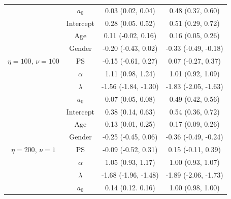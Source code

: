 \documentclass[a4paper, notitlepage, 11pt]{article}
\begin{document}
\begin{table}[!ht]
\begin{tabular}{cccc}
                                            & $a_0$     & 0.03 (0.02, 0.04)    & 0.48 (0.37, 0.60)           \\
\multirow{7}{*}{$\eta = 100$, $\nu  = 100$} & Intercept & 0.28 (0.05. 0.52)    & 0.51 (0.29, 0.72)           \\
                                            & Age       & 0.11 (-0.02, 0.16)   & 0.16 (0.05, 0.26)           \\
                                            & Gender    & -0.20 (-0.43, 0.02)  & -0.33 (-0.49, -0.18)        \\
                                            & PS        & -0.15 (-0.61, 0.27)  & 0.07 (-0.27, 0.37)          \\
                                            & $\alpha$  & 1.11 (0.98, 1.24)    & 1.01 (0.92, 1.09)           \\
                                            & $\lambda$ & -1.56 (-1.84, -1.30) & -1.83 (-2.05, -1.63)        \\
                                            & $a_0$     & 0.07 (0.05, 0.08)    & 0.49 (0.42, 0.56)           \\
\multirow{7}{*}{$\eta = 200$, $\nu  = 1$}   & Intercept & 0.38 (0.14, 0.63)    & 0.54 (0.36, 0.72)           \\
                                            & Age       & 0.13 (0.01, 0.25)    & 0.17 (0.09, 0.26)           \\
                                            & Gender    & -0.25 (-0.45, 0.06)  & -0.36 (-0.49, -0.24)        \\
                                            & PS        & -0.09 (-0.52, 0.31)  & 0.15 (-0.11, 0.39)          \\
                                            & $\alpha$  & 1.05 (0.93, 1.17)    & 1.00 (0.93, 1.07)           \\
                                            & $\lambda$ & -1.68 (-1.96, -1.48) & -1.89 (-2.06, -1.73)        \\
                                            & $a_0$     & 0.14 (0.12. 0.16)    & 1.00 (0.98, 1.00)           \\ \cline{2-4} 
\end{tabular}
\end{table}

\end{document}
